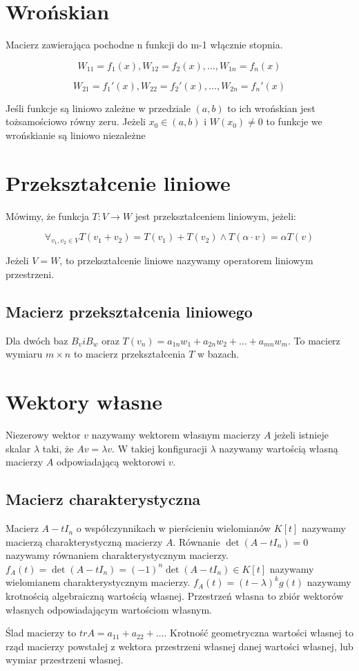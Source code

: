 \documentclass{../notatki}
\begin{document}
\section{Wrońskian}

Macierz zawierająca pochodne n funkcji do m-1 włącznie stopnia.

$$
W_{11} = f_1(x), W_{12} = f_2(x), \dots, W_{1n} = f_n(x)
$$

$$
W_{21} = f_1'(x), W_{22} = f_2'(x), \dots, W_{2n} = f_n'(x)
$$

Jeśli funkcje są liniowo zależne w przedziale $(a,b)$ to ich
wrońskian jest tożsamościowo równy zeru.
Jeżeli $x_0 \in (a, b)$ i $W(x_0) \ne 0$ to funkcje we wrońskianie są
liniowo niezależne

\section{Przekształcenie liniowe}

Mówimy, że funkcja $T: V \rightarrow W$ jest przekształceniem liniowym, jeżeli:

$$
\forall_{v_1, v_2 \in V} T(v_1 + v_2) = T(v_1) + T(v_2) \land
T(\alpha \cdot v) = \alpha T(v)
$$

Jeżeli $V = W$, to przekształcenie liniowe nazywamy operatorem
liniowym przestrzeni.

\subsection{Macierz przekształcenia liniowego}

Dla dwóch baz $B_v i B_w$ oraz $T(v_n) = a_{1n}w_1 + a_{2n}w_2 +
\dots + a_{mn}w_m$.
To macierz wymiaru $m \times n$ to macierz przekształcenia $T$ w bazach.

\section{Wektory własne}

Niezerowy wektor $v$ nazywamy wektorem własnym macierzy $A$ jeżeli istnieje
skalar $\lambda$ taki, że $Av = \lambda v$. W takiej konfiguracji $\lambda$
nazywamy wartością własną macierzy $A$ odpowiadającą wektorowi $v$.

\subsection{Macierz charakterystyczna}

Macierz $A - tI_n$ o współczynnikach w pierścieniu wielomianów $K[t]$ nazywamy
macierzą charakterystyczną macierzy $A$. Równanie $\det(A - tI_n) = 0$ nazywamy
równaniem charakterystycznym macierzy. $f_A(t) = \det(A -
tI_n)=(-1)^n\det(A - tI_n) \in K[t]$ nazywamy wielomianem charakterystycznym
macierzy. $f_A(t) = (t - \lambda)^kg(t)$ nazywamy krotnością
algebraiczną wartością
własnej. Przestrzeń własna to zbiór wektorów własnych odpowiadającym wartościom
własnym.

Ślad macierzy to $tr A = a_{11} + a_{22} + \dots$. Krotność geometryczna
wartości własnej to rząd macierzy powstałej z wektora przestrzeni własnej danej
wartości własnej, lub wymiar przestrzeni własnej.
\end{document}
